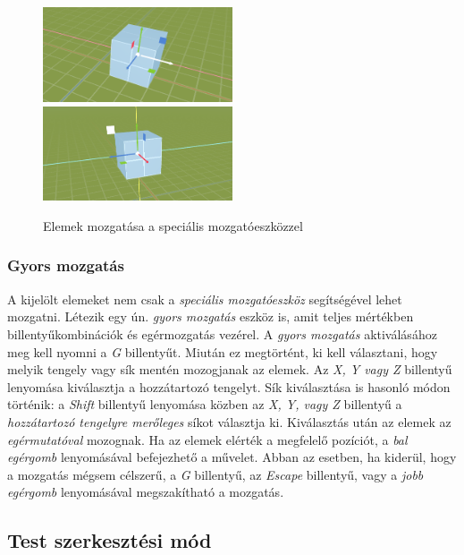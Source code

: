 \begin{figure}[h]
    \centering
    \includegraphics[width=0.5\textwidth]{parts/user-documentation/editor/images/move_in_action.png}
    \includegraphics[width=0.5\textwidth]{parts/user-documentation/editor/images/move_in_action_plane.png}
    \caption{Elemek mozgatása a speciális mozgatóeszközzel}
\end{figure}

\subsubsection{Gyors mozgatás}

A kijelölt elemeket nem csak a \emph{speciális mozgatóeszköz} segítségével lehet mozgatni. Létezik
egy ún. \emph{gyors mozgatás} eszköz is, amit teljes mértékben billentyűkombinációk és egérmozgatás
vezérel. A \emph{gyors mozgatás} aktiválásához meg kell nyomni a \emph{G} billentyűt. Miután ez
megtörtént, ki kell választani, hogy melyik tengely vagy sík mentén mozogjanak az elemek. Az
\emph{X, Y vagy Z} billentyű lenyomása kiválasztja a hozzátartozó tengelyt. Sík kiválasztása is
hasonló módon történik: a \emph{Shift} billentyű lenyomása közben az \emph{X, Y, vagy Z} billentyű
a \emph{hozzátartozó tengelyre merőleges} síkot választja ki. Kiválasztás után az elemek az
\emph{egérmutatóval} mozognak. Ha az elemek elérték a megfelelő pozíciót, a \emph{bal egérgomb}
lenyomásával befejezhető a művelet. Abban az esetben, ha kiderül, hogy a mozgatás mégsem célszerű,
a \emph{G} billentyű, az \emph{Escape} billentyű, vagy a \emph{jobb egérgomb} lenyomásával megszakítható a mozgatás.

\subsection{Test szerkesztési mód}

